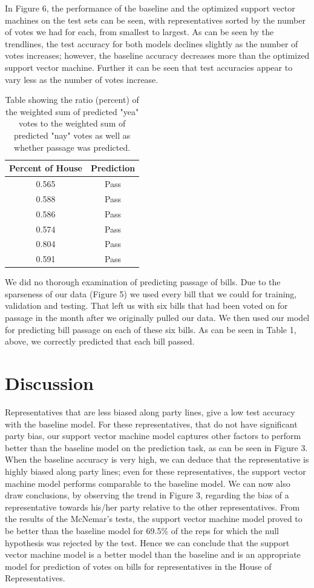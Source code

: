 \documentclass[11pt,letterpaper,twocolumn]{article}
\begin{document}
In Figure 6, the performance of the baseline and the optimized support vector machines on the test sets can be seen, with representatives sorted by the number of votes we had for each, from smallest to largest. As can be seen by the trendlines, the test accuracy for both models declines slightly as the number of votes increases; however, the baseline accuracy decreases more than the optimized support vector machine. Further it can be seen that test accuracies appear to vary less as the number of votes increase.

\begin{table}
\centering
\begin{tabular}{|c|c|} \hline
Percent of House & Prediction \\ \hline
0.565 & Pass \\ \hline
0.588 & Pass\\ \hline
0.586 & Pass\\ \hline
0.574 & Pass\\ \hline
0.804 & Pass\\ \hline
0.591 & Pass\\ \hline
\end{tabular}
\caption{Table showing the ratio (percent) of the weighted sum of predicted "yea" votes to the weighted sum of predicted "nay" votes as well as whether passage was predicted.}
\end{table}

We did no thorough examination of predicting passage of bills. Due to the sparseness of our data (Figure 5) we used every bill that we could for training, validation and testing. That left us with six bills that had been voted on for passage in the month after we originally pulled our data. We then used our model for predicting bill passage on each of these six bills. As can be seen in Table 1, above, we correctly predicted that each bill passed. 

\section{Discussion}
Representatives that are less biased along party lines, give a low test accuracy with the baseline model. For these representatives, that do not have significant party bias, our support vector machine model captures other factors to perform better than the baseline model on the prediction task, as can be seen in Figure 3. When the baseline accuracy is very high, we can deduce that the representative is highly biased along party lines; even for these representatives, the support vector machine model performs comparable to the baseline model. We can now also draw conclusions,  by observing the trend in Figure 3, regarding the bias of a representative towards his/her party relative to the other representatives. From the results of the McNemar's tests, the support vector machine model proved to be better than the baseline model for 69.5\% of the reps for which the null hypothesis was rejected by the test. Hence we can conclude that the support vector machine model is a better model than the baseline and is an appropriate model for prediction of votes on bills for representatives in the House of Representatives.
\end{document}
